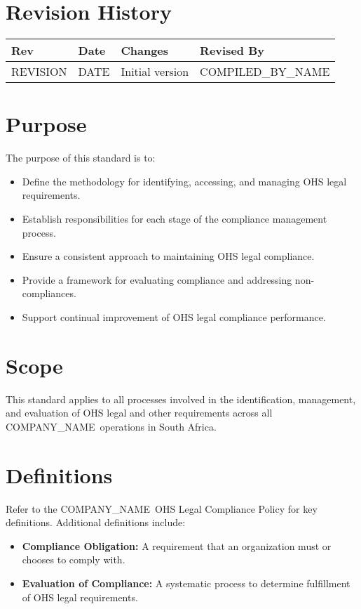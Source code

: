 \documentclass[11pt]{article}
\newcommand{\issueDate}{{{DATE}}}
\newcommand{\clientName}{{{COMPANY_NAME}}}
\newcommand{\compilerName}{{{COMPILED_BY_NAME}}}
\newcommand{\revision}{{{REVISION}}}
\begin{document}
\section{Revision History}
\begin{tabularx}{\textwidth}{lXll}
  \toprule
  \textbf{Rev} & \textbf{Date} & \textbf{Changes} & \textbf{Revised By} \\
  \midrule
  \revision & \issueDate & Initial version & \compilerName \\
  \bottomrule
\end{tabularx}

\section{Purpose}
The purpose of this standard is to:
\begin{itemize}
    \item Define the methodology for identifying, accessing, and managing OHS legal requirements.
    \item Establish responsibilities for each stage of the compliance management process.
    \item Ensure a consistent approach to maintaining OHS legal compliance.
    \item Provide a framework for evaluating compliance and addressing non-compliances.
    \item Support continual improvement of OHS legal compliance performance.
\end{itemize}

\section{Scope}
This standard applies to all processes involved in the identification, management, and evaluation of OHS legal and other requirements across all \clientName\ operations in South Africa.

\section{Definitions}
Refer to the \clientName\ OHS Legal Compliance Policy for key definitions. Additional definitions include:
\begin{itemize}
    \item \textbf{Compliance Obligation:} A requirement that an organization must or chooses to comply with.
    \item \textbf{Evaluation of Compliance:} A systematic process to determine fulfillment of OHS legal requirements.
\end{itemize}
\end{document}
